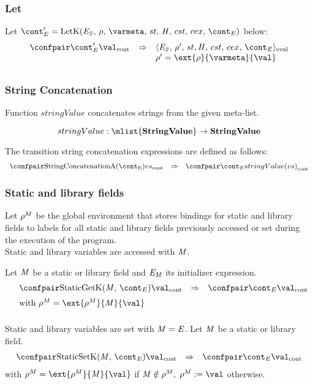 \documentclass{article}
\begin{document}
\subsubsection{Let}
Let $\econt' = \LetK{\expri{2}}{\env}{\varmeta}{\econt}$ below:
\[
  \begin{array}{rcl}
	\cesktrans{
		\contconf{\econt'}{\val}}{
		\evalconf{\expri{2}}{\env'}{\strace}{\cstrace}{\cex}{\econt}}
		\\
	&&\env'=\ext{\env}{\varmeta}{\val}\\[2mm]
  \end{array}
\]
\subsubsection{String Concatenation}
\label{subsubsec:string-concatenation}
Function $stringValue$ concatenates strings from the given meta-list.

\[stringValue : \mlist{\dstring} \rightarrow \dstring\]

\noindent
The transition string concatenation expressions are defined as follows:
\[
  \begin{array}{rcl}
	\cesktrans{
		\contconf{\StringConcatenationA}{\vals}}{
		\contconf{\econt}{stringValue(\vals)}}
  \end{array}
\]


\subsubsection{Static and library fields}
\label{subsubsec:static-and-library-fields}

Let $\rho^{M}$ be the global environment that stores bindings for static and library fields to labels for all static and library fields previously accessed or set during the execution of the program.\\
Static and library variables are accessed with $\mathit{M}$. 

\noindent
Let $\mathit{M}$ be a static or library field and $\mathit{E}_{\mathit{M}}$ its initializer expression.
\[
  \begin{array}{rlcl}
	&\cesktrans{
		\contconf{\StaticGetK}{\val}}{
		\contconf{\econt}{\val}}
		\\[2mm]
	&\textrm{with }\env^{M} = \ext{\env^{M}}{\membermeta}{\val}
	\\[2mm]
  \end{array}
\]

Static and library variables are set with $\mathit{M}=\mathit{E}$.
Let $\mathit{M}$ be a static or library field.
\[
  \begin{array}{rcl}
	\cesktrans{
		\contconf{\StaticSetK}{\val}}{
		\contconf{\econt}{\val}}
  \end{array}
\]
with $\env^{M} = \ext{\env^{M}}{\membermeta}{\val}$ if $\mathit{M} \notin \rho^M,$ $\update{\env^{M}}{\val}$ otherwise.\\
\end{document}
